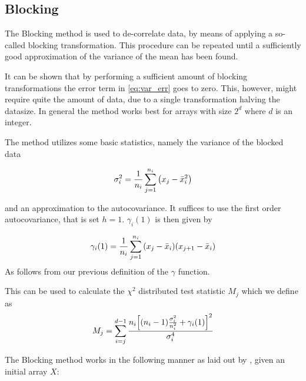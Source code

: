 \documentclass[aps,reprint,superscriptaddress,nofootinbib]{revtex4-2}
\begin{document}
    
\subsection*{Blocking}
    
    The Blocking method is used to de-correlate data, by means of applying a so-called blocking transformation. This procedure can be repeated until a sufficiently good approximation of the variance of the mean has been found.
    
    It can be shown \cite{MJ_Blocking} that by performing a sufficient amount of blocking transformations the error term in \ref{eq:var_err} goes to zero. This, however, might require quite the amount of data, due to a single transformation halving the datasize. In general the method works best for arrays with size $2^d$ where $d$ is an integer.
    
    The method utilizes some basic statistics, namely the variance of the blocked data
    
    \begin{equation*}
        \sigma_i^2 = \frac{1}{n_i}\sum_{j = 1}^{n_i}\qty(x_j - \bar{x}_i^2)
    \end{equation*}
    
    and an approximation to the autocovariance. It suffices to use the first order autocovariance, that is set $h = 1$. $\gamma_i(1)$ is then given by
    
    \begin{equation*}
        \gamma_i(1) = \frac{1}{n_i}\sum_{j=1}^{n_i}\qty(x_j - \bar{x}_i)\qty(x_{j+1} - \bar{x}_i)
    \end{equation*}
    As follows from our previous definition of the $\gamma$ function.
    
    This can be used to calculate the $\chi^2$ distributed test statistic $M_j$ which we define as
    \begin{equation*}
        M_j = \sum_{i=j}^{d-1}\frac{n_i\qty[ \qty(n_i - 1)\frac{\sigma_i^2}{n_i^2} + \gamma_i(1) ]^2}{\sigma_i^4}
    \end{equation*}
    
    The Blocking method works in the following manner as laid out by \cite{MJ_Blocking}, given an initial array $X$:
    
\end{document}
